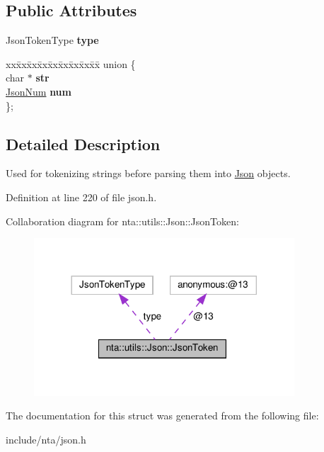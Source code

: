 \subsection*{Public Attributes}
\begin{DoxyCompactItemize}
\item 
\mbox{\label{structnta_1_1utils_1_1Json_1_1JsonToken_ab0bf0cda189a3063f326abcbf57532bb}} 
Json\+Token\+Type {\bfseries type}
\item 
\mbox{\label{structnta_1_1utils_1_1Json_1_1JsonToken_a7123d444ecb1662248a2b54d4f27d087}} 
\begin{tabbing}
xx\=xx\=xx\=xx\=xx\=xx\=xx\=xx\=xx\=\kill
union \{\\
\mbox{\label{structnta_1_1utils_1_1Json_1_1JsonToken_a249048bb34d397d9f9034391f07e8666}} 
char $\ast$ {\bfseries str}\\
\mbox{\label{structnta_1_1utils_1_1Json_1_1JsonToken_a276868d3bfc600a8e9b00a9719d09122}} 
\hyperlink{classnta_1_1utils_1_1JsonNum}{JsonNum} {\bfseries num}\\
\}; \\

\end{tabbing}\end{DoxyCompactItemize}


\subsection{Detailed Description}
Used for tokenizing strings before parsing them into \hyperlink{classnta_1_1utils_1_1Json}{Json} objects. 

Definition at line 220 of file json.\+h.



Collaboration diagram for nta\+:\+:utils\+:\+:Json\+:\+:Json\+Token\+:
\nopagebreak
\begin{figure}[H]
\begin{center}
\leavevmode
\includegraphics[width=276pt]{d9/d6a/structnta_1_1utils_1_1Json_1_1JsonToken__coll__graph}
\end{center}
\end{figure}


The documentation for this struct was generated from the following file\+:\begin{DoxyCompactItemize}
\item 
include/nta/json.\+h\end{DoxyCompactItemize}

